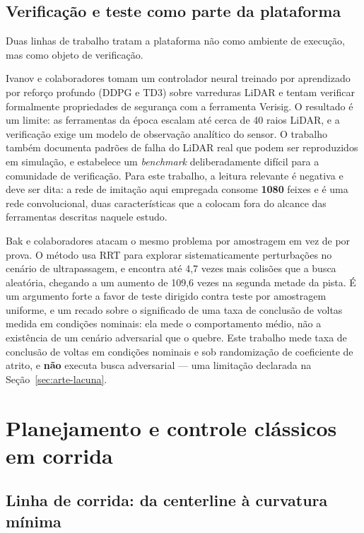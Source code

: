 \subsection{Verificação e teste como parte da plataforma}

Duas linhas de trabalho tratam a plataforma não como ambiente de execução, mas
como objeto de verificação.

Ivanov e colaboradores \cite{Ivanov2020Verifying} tomam um controlador neural
treinado por aprendizado por reforço profundo (DDPG e TD3) sobre varreduras
LiDAR e tentam verificar formalmente propriedades de segurança com a ferramenta
Verisig. O resultado é um limite: as ferramentas da época escalam até cerca de
40 raios LiDAR, e a verificação exige um modelo de observação analítico do
sensor. O trabalho também documenta padrões de falha do LiDAR real que podem ser
reproduzidos em simulação, e estabelece um \textit{benchmark} deliberadamente
difícil para a comunidade de verificação. Para este trabalho, a leitura relevante
é negativa e deve ser dita: a rede de imitação aqui empregada consome
\textbf{1080} feixes e é uma rede convolucional, duas características que a
colocam fora do alcance das ferramentas descritas naquele estudo.

Bak e colaboradores \cite{Bak2021Stress} atacam o mesmo problema por amostragem
em vez de por prova. O método usa RRT \cite{Karaman2011Optimal} para explorar
sistematicamente perturbações no cenário de ultrapassagem, e encontra até 4,7
vezes mais colisões que a busca aleatória, chegando a um aumento de 109,6 vezes
na segunda metade da pista. É um argumento forte a favor de teste dirigido
contra teste por amostragem uniforme, e um recado sobre o significado de uma
taxa de conclusão de voltas medida em condições nominais: ela mede o
comportamento médio, não a existência de um cenário adversarial que o quebre.
Este trabalho mede taxa de conclusão de voltas em condições nominais e sob
randomização de coeficiente de atrito, e \textbf{não} executa busca adversarial
--- uma limitação declarada na Seção~\ref{sec:arte-lacuna}.

\section{Planejamento e controle clássicos em corrida}\label{sec:arte-classico}

\subsection{Linha de corrida: da centerline à curvatura mínima}

